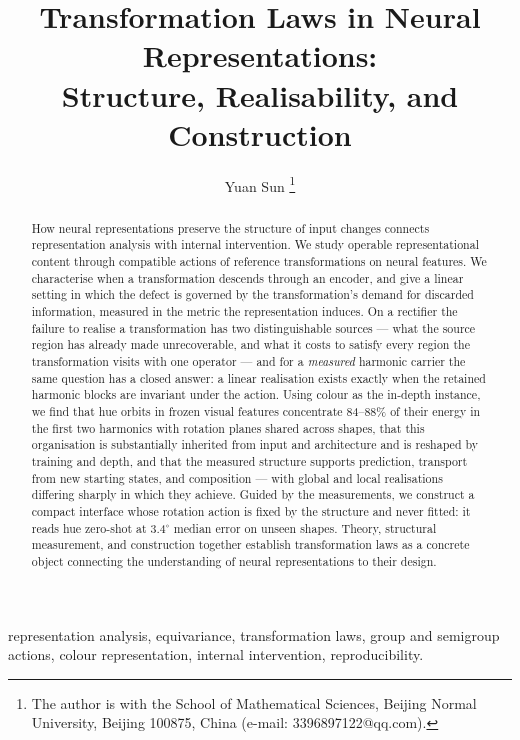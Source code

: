 \documentclass[journal]{IEEEtran}
\title{Transformation Laws in Neural Representations:\\
Structure, Realisability, and Construction}
\author{Yuan Sun%
\thanks{The author is with the School of Mathematical Sciences, Beijing Normal University,
Beijing 100875, China (e-mail: 3396897122@qq.com).}}
\begin{document}
\maketitle


\begin{abstract}

How neural representations preserve the structure of input changes connects representation analysis with internal intervention. We study operable representational content through compatible actions of reference transformations on neural features. We characterise when a transformation descends through an encoder, and give a linear setting in which the defect is governed by the transformation's demand for discarded information, measured in the metric the representation induces. On a rectifier the failure to realise a transformation has two distinguishable sources --- what the source region has already made unrecoverable, and what it costs to satisfy every region the transformation visits with one operator --- and for a \textit{measured} harmonic carrier the same question has a closed answer: a linear realisation exists exactly when the retained harmonic blocks are invariant under the action. Using colour as the in-depth instance, we find that hue orbits in frozen visual features concentrate 84--88\% of their energy in the first two harmonics with rotation planes shared across shapes, that this organisation is substantially inherited from input and architecture and is reshaped by training and depth, and that the measured structure supports prediction, transport from new starting states, and composition --- with global and local realisations differing sharply in which they achieve. Guided by the measurements, we construct a compact interface whose rotation action is fixed by the structure and never fitted: it reads hue zero-shot at 3.4$^\circ$ median error on unseen shapes. Theory, structural measurement, and construction together establish transformation laws as a concrete object connecting the understanding of neural representations to their design.



\end{abstract}

\begin{IEEEkeywords}
representation analysis, equivariance, transformation laws, group and semigroup actions, colour representation, internal intervention, reproducibility.
\end{IEEEkeywords}
\end{document}

